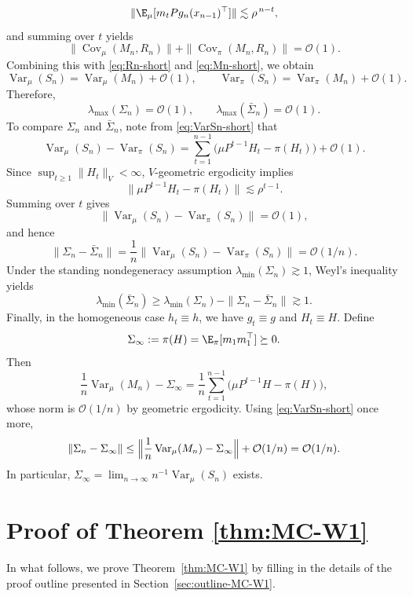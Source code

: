 \documentclass[mnsc,nonblindrev]{informs3}
\begin{document}
\[
\|\E_\mu[m_tPg_n(x_{n-1})^\top]\|\lesssim \rho^{\,n-t},
\]
and summing over \(t\) yields
\[
\|\operatorname{Cov}_\mu(M_n,R_n)\|+\|\operatorname{Cov}_\pi(M_n,R_n)\|=\mathcal O(1).
\]
Combining this with \eqref{eq:Rn-short} and \eqref{eq:Mn-short}, we obtain
\begin{equation}\label{eq:VarSn-short}
\operatorname{Var}_\mu(S_n)=\operatorname{Var}_\mu(M_n)+\mathcal O(1),
\qquad
\operatorname{Var}_\pi(S_n)=\operatorname{Var}_\pi(M_n)+\mathcal O(1).
\end{equation}
Therefore,
\[
\lambda_{\max}(\Sigma_n)=\mathcal O(1),
\qquad
\lambda_{\max}(\bar\Sigma_n)=\mathcal O(1).
\]
To compare \(\Sigma_n\) and \(\bar\Sigma_n\), note from \eqref{eq:VarSn-short} that
\[
\operatorname{Var}_\mu(S_n)-\operatorname{Var}_\pi(S_n)
=
\sum_{t=1}^{n-1}\bigl(\mu P^{t-1}H_t-\pi(H_t)\bigr)+\mathcal O(1).
\]
Since \(\sup_{t\ge 1}\|H_t\|_V<\infty\), \(V\)-geometric ergodicity implies
\[
\|\mu P^{t-1}H_t-\pi(H_t)\|\lesssim \rho^{t-1}.
\]
Summing over \(t\) gives
\[
\|\operatorname{Var}_\mu(S_n)-\operatorname{Var}_\pi(S_n)\|=\mathcal O(1),
\]
and hence
\[
\|\Sigma_n-\bar\Sigma_n\|
=
\frac1n\|\operatorname{Var}_\mu(S_n)-\operatorname{Var}_\pi(S_n)\|
=
\mathcal O(1/n).
\]
Under the standing nondegeneracy assumption \(\lambda_{\min}(\Sigma_n)\gtrsim 1\),
Weyl's inequality yields
\[
\lambda_{\min}(\bar\Sigma_n)
\ge \lambda_{\min}(\Sigma_n)-\|\Sigma_n-\bar\Sigma_n\|
\gtrsim 1.
\]
Finally, in the homogeneous case \(h_t\equiv h\), we have \(g_t\equiv g\) and
\(H_t\equiv H\). Define
\[
\Sigma_\infty:=\pi(H)=\E_\pi[m_1m_1^\top]\succeq 0.
\]
Then
\[
\frac1n\operatorname{Var}_\mu(M_n)-\Sigma_\infty
=
\frac1n\sum_{t=1}^{n-1}\bigl(\mu P^{t-1}H-\pi(H)\bigr),
\]
whose norm is \(\mathcal O(1/n)\) by geometric ergodicity. Using
\eqref{eq:VarSn-short} once more,
\[
\|\Sigma_n-\Sigma_\infty\|
\le
\Bigl\|\frac1n\operatorname{Var}_\mu(M_n)-\Sigma_\infty\Bigr\|+\mathcal O(1/n)
=
\mathcal O(1/n).
\]
In particular, \(\Sigma_\infty=\lim_{n\to\infty}n^{-1}\operatorname{Var}_\mu(S_n)\) exists.




\section{Proof of Theorem \ref{thm:MC-W1}}\label{sec:proof-MC-W1}
In what follows, we prove Theorem~\ref{thm:MC-W1} by filling in the details of the proof outline
presented in Section~\ref{sec:outline-MC-W1}.
\end{document}

